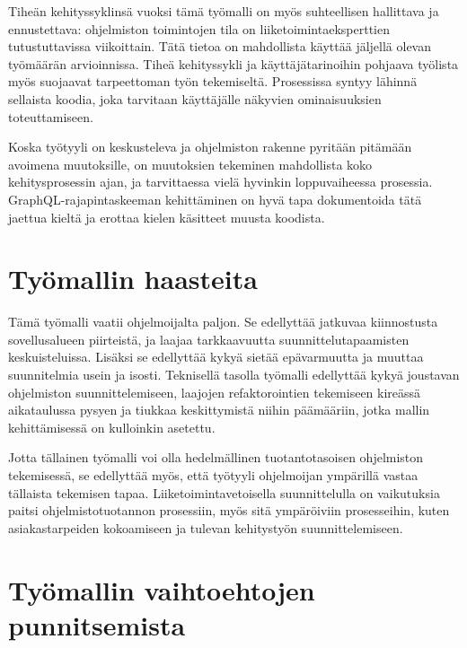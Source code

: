 Tiheän kehityssyklinsä vuoksi tämä työmalli on myös suhteellisen
hallittava ja ennustettava: ohjelmiston toimintojen tila on
liiketoimintaeksperttien tutustuttavissa viikoittain. Tätä tietoa on
mahdollista käyttää jäljellä olevan työmäärän arvioinnissa. Tiheä
kehityssykli ja käyttäjätarinoihin pohjaava työlista myös suojaavat
tarpeettoman työn tekemiseltä. Prosessissa syntyy lähinnä sellaista
koodia, joka tarvitaan käyttäjälle näkyvien ominaisuuksien
toteuttamiseen.

Koska työtyyli on keskusteleva ja ohjelmiston rakenne pyritään pitämään
avoimena muutoksille, on muutoksien tekeminen mahdollista koko
kehitysprosessin ajan, ja tarvittaessa vielä hyvinkin loppuvaiheessa
prosessia. GraphQL-rajapintaskeeman kehittäminen on hyvä tapa
dokumentoida tätä jaettua kieltä ja erottaa kielen käsitteet muusta
koodista.

\hypertarget{tyuxf6mallin-haasteita}{%
\section{Työmallin haasteita}\label{tyuxf6mallin-haasteita}}

Tämä työmalli vaatii ohjelmoijalta paljon. Se edellyttää jatkuvaa
kiinnostusta sovellusalueen piirteistä, ja laajaa tarkkaavuutta
suunnittelutapaamisten keskuisteluissa. Lisäksi se edellyttää kykyä
sietää epävarmuutta ja muuttaa suunnitelmia usein ja isosti. Teknisellä
tasolla työmalli edellyttää kykyä joustavan ohjelmiston
suunnittelemiseen, laajojen refaktorointien tekemiseen kireässä
aikataulussa pysyen ja tiukkaa keskittymistä niihin päämääriin, jotka
mallin kehittämisessä on kulloinkin asetettu.

Jotta tällainen työmalli voi olla hedelmällinen tuotantotasoisen
ohjelmiston tekemisessä, se edellyttää myös, että työtyyli ohjelmoijan
ympärillä vastaa tällaista tekemisen tapaa. Liiketoimintavetoisella
suunnittelulla on vaikutuksia paitsi ohjelmistotuotannon prosessiin,
myös sitä ympäröiviin prosesseihin, kuten asiakastarpeiden kokoamiseen
ja tulevan kehitystyön suunnittelemiseen.

\hypertarget{tyuxf6mallin-vaihtoehtojen-punnitsemista}{%
\section{Työmallin vaihtoehtojen
punnitsemista}\label{tyuxf6mallin-vaihtoehtojen-punnitsemista}}

